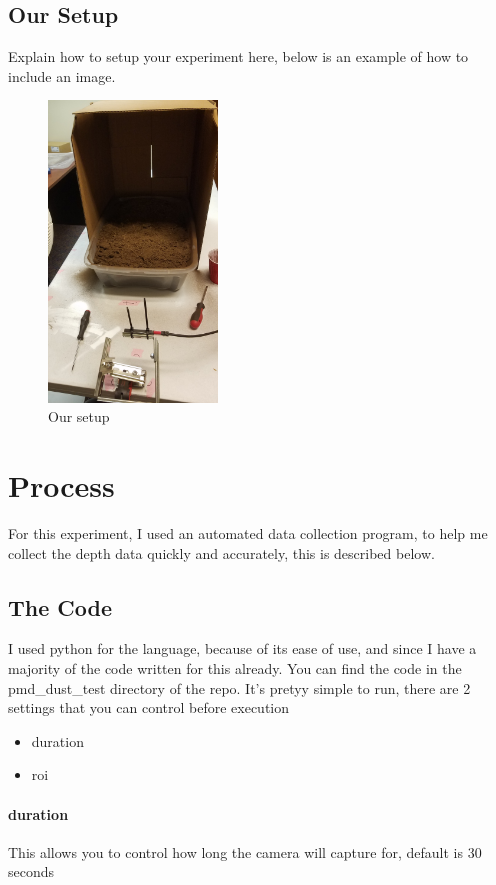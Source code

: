 \documentclass{article}
\begin{document}
		\subsection{Our Setup}
			Explain how to setup your experiment here, below is an example of how to include an image.
			
			\begin{figure}[h]
				\includegraphics[angle=270, origin=c, height=8cm]{./images/our_setup.jpg}
				\centering
				\caption{Our setup}
				\label{fig:setup}
			\end{figure}
			
	\section{Process}
		For this experiment, I used an automated data collection program, to help me collect the depth data quickly and accurately, this is described below.
		
		\newpage
		
		\subsection{The Code}
			I used python for the language, because of its ease of use, and since I have a majority of the code written for this already.
			You can find the code in the pmd\_dust\_test directory of the repo.  It's pretyy simple to run, there are 2 settings that you can control before execution
			\begin{itemize}
				\item duration
				\item roi
			\end{itemize}
			\paragraph{duration} This allows you to control how long the camera will capture for, default is 30 seconds
\end{document}

